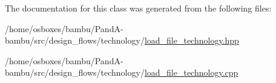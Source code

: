 The documentation for this class was generated from the following files\+:\begin{DoxyCompactItemize}
\item 
/home/osboxes/bambu/\+Pand\+A-\/bambu/src/design\+\_\+flows/technology/\hyperlink{load__file__technology_8hpp}{load\+\_\+file\+\_\+technology.\+hpp}\item 
/home/osboxes/bambu/\+Pand\+A-\/bambu/src/design\+\_\+flows/technology/\hyperlink{load__file__technology_8cpp}{load\+\_\+file\+\_\+technology.\+cpp}\end{DoxyCompactItemize}
